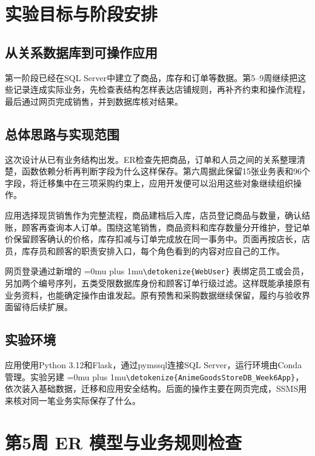\documentclass{SYSUReport}
\date{2026年10月24日}
\newcommand{\code}[1]{\begingroup\Urlmuskip=0mu plus 1mu\expandafter\nolinkurl\expandafter{\detokenize{#1}}\endgroup}
\begin{document}
\hypersetup{pageanchor=false}
\cover\thispagestyle{empty}\clearpage
{}\setcounter{page}{1}\hypersetup{pageanchor=true}
\begingroup\fontsize{9.5pt}{10.8pt}\selectfont\setlength{\parskip}{0pt}\tableofcontents\endgroup
\clearpage{}\setcounter{page}{1}

\section{实验目标与阶段安排}
\subsection{从关系数据库到可操作应用}
第一阶段已经在SQL Server中建立了商品，库存和订单等数据。第5--9周继续把这些记录连成实际业务，先检查表结构怎样表达店铺规则，再补齐约束和操作流程，最后通过网页完成销售，并到数据库核对结果。



\subsection{总体思路与实现范围}
这次设计从已有业务结构出发。ER检查先把商品，订单和人员之间的关系整理清楚，函数依赖分析再判断字段为什么这样保存。第六周据此保留15张业务表和96个字段，将迁移集中在三项采购约束上，应用开发便可以沿用这些对象继续组织操作。

应用选择现货销售作为完整流程，商品建档后入库，店员登记商品与数量，确认结账，顾客再查询本人订单。围绕这笔销售，商品资料和库存数量分开维护，登记单价保留顾客确认的价格，库存扣减与订单完成放在同一事务中。页面再按店长，店员，库存员和顾客的职责安排入口，每个角色看到的内容对应自己的工作。

网页登录通过新增的 \code{WebUser} 表绑定员工或会员，另加两个编号序列，五类受限数据库身份和顾客订单行级过滤。这样既能承接原有业务资料，也能确定操作由谁发起。原有预售和采购数据继续保留，履约与验收界面留待后续扩展。

\subsection{实验环境}
应用使用Python 3.12和Flask，通过pymssql连接SQL Server，运行环境由Conda管理。实验另建 \code{AnimeGoodsStoreDB_Week6App}，依次装入基础数据，迁移和应用安全结构。后面的操作主要在网页完成，SSMS用来核对同一笔业务实际保存了什么。

\section{第5周 ER 模型与业务规则检查}
\end{document}

